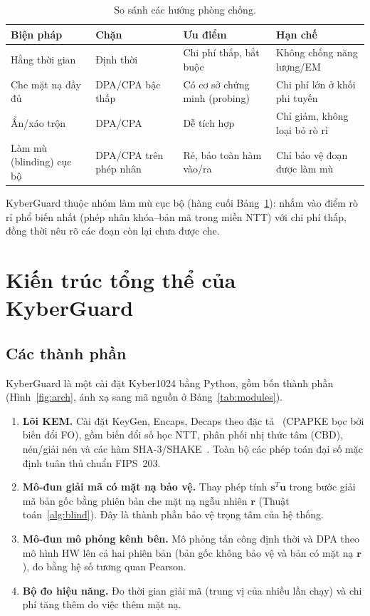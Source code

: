 \documentclass[../LuanVan.tex]{subfiles}
\begin{document}
\begin{table}[H]
\centering
\caption{So sánh các hướng phòng chống.}
\label{tab:countermeasures}
\small
\begin{tabular}{@{}p{3cm}p{3.4cm}p{3.6cm}p{3.4cm}@{}}
\toprule
\textbf{Biện pháp} & \textbf{Chặn} & \textbf{Ưu điểm} & \textbf{Hạn chế} \\
\midrule
Hằng thời gian & Định thời & Chi phí thấp, bắt buộc & Không chống năng lượng/EM \\
Che mặt nạ đầy đủ & DPA/CPA bậc thấp & Có cơ sở chứng minh (probing) & Chi phí lớn ở khối phi tuyến \\
Ẩn/xáo trộn & DPA/CPA & Dễ tích hợp & Chỉ giảm, không loại bỏ rò rỉ \\
Làm mù (blinding) cục bộ & DPA/CPA trên phép nhân & Rẻ, bảo toàn hàm vào/ra & Chỉ bảo vệ đoạn được làm mù \\
\bottomrule
\end{tabular}
\end{table}
 
KyberGuard thuộc nhóm làm mù cục bộ (hàng cuối Bảng~\ref{tab:countermeasures}): nhắm vào điểm rò rỉ phổ biến nhất (phép nhân khóa--bản mã trong miền NTT) với chi phí thấp, đồng thời nêu rõ các đoạn còn lại chưa được che.
 
\section{Kiến trúc tổng thể của KyberGuard}
\label{sec:arch}
 
\subsection{Các thành phần}
 
KyberGuard là một cài đặt Kyber1024 bằng Python, gồm bốn thành phần (Hình~\ref{fig:arch}, ánh xạ sang mã nguồn ở Bảng~\ref{tab:modules}).
 
\begin{enumerate}
\item \textbf{Lõi KEM.} Cài đặt KeyGen, Encaps, Decaps theo đặc tả~\cite{Avanzi21} (CPAPKE bọc bởi biến đổi FO), gồm biến đổi số học NTT, phân phối nhị thức tâm (CBD), nén/giải nén và các hàm SHA-3/SHAKE~\cite{FIPS202}. Toàn bộ các phép toán đại số mặc định tuân thủ chuẩn FIPS~203.
\item \textbf{Mô-đun giải mã có mặt nạ bảo vệ.} Thay phép tính $\mathbf{s}^T\mathbf{u}$ trong bước giải mã bản gốc bằng phiên bản che mặt nạ ngẫu nhiên $\mathbf{r}$ (Thuật toán~\ref{alg:blind}). Đây là thành phần bảo vệ trọng tâm của hệ thống.
\item \textbf{Mô-đun mô phỏng kênh bên.} Mô phỏng tấn công định thời và DPA theo mô hình HW lên cả hai phiên bản (bản gốc không bảo vệ và bản có mặt nạ $\mathbf{r}$), đo bằng hệ số tương quan Pearson.
\item \textbf{Bộ đo hiệu năng.} Đo thời gian giải mã (trung vị của nhiều lần chạy) và chi phí tăng thêm do việc thêm mặt nạ.
\end{enumerate}
 
\end{document}
